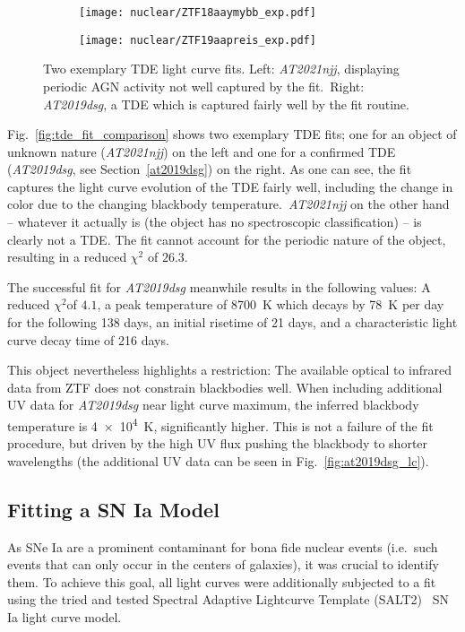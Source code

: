 \begin{figure}[htb]
  \centering
  \begin{subfigure}[b]{0.49\textwidth}
    \centering
    \texttt{[image: nuclear/ZTF18aaymybb\_exp.pdf]}
  \end{subfigure}
  \begin{subfigure}[b]{0.49\textwidth}
    \centering
    \texttt{[image: nuclear/ZTF19aapreis\_exp.pdf]}
  \end{subfigure}
  \caption[Two exemplary TDE fits]{Two exemplary TDE light curve fits. Left: \textit{AT2021njj}, displaying periodic AGN activity not well captured by the fit.\ Right: \textit{AT2019dsg}, a TDE which is captured fairly well by the fit routine.}
\end{figure}

Fig.~\ref{fig:tde_fit_comparison} shows two exemplary TDE fits; one for an object of unknown nature (\textit{AT2021njj}) on the left and one for a confirmed TDE (\textit{AT2019dsg}, see Section~\ref{at2019dsg}) on the right. As one can see, the fit captures the light curve evolution of the TDE fairly well, including the change in color due to the changing blackbody temperature.~\textit{AT2021njj} on the other hand -- whatever it actually is (the object has no spectroscopic classification) -- is clearly not a TDE. The fit cannot account for the periodic nature of the object, resulting in a reduced $\chi^2$ of $26.3$.

The successful fit for \textit{AT2019dsg} meanwhile results in the following values: A reduced $\chi^2$of $4.1$, a peak temperature of \SI{8700}{\K} which decays by \SI{78}{\K} per day for the following 138 days, an initial risetime of 21 days, and a characteristic light curve decay time of 216 days.

This object nevertheless highlights a restriction: The available optical to infrared data from ZTF does not constrain blackbodies well. When including additional UV data for \textit{AT2019dsg} near light curve maximum, the inferred blackbody temperature is \SI{4e4}{\K}, significantly higher. This is not a failure of the fit procedure, but driven by the high UV flux pushing the blackbody to shorter wavelengths (the additional UV data can be seen in Fig.~\ref{fig:at2019dsg_lc}).

\subsection{Fitting a SN Ia Model}\label{salt}
As SNe Ia are a prominent contaminant for bona fide nuclear events (i.e.~such events that can only occur in the centers of galaxies), it was crucial to identify them. To achieve this goal, all light curves were additionally subjected to a fit using the tried and tested Spectral Adaptive Lightcurve Template (SALT2)~ SN Ia light curve model.


